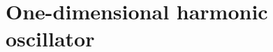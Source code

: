 \chapter{One-dimensional harmonic oscillator}
\startcontents[chapters]
{\vspace{2em}\color{black}\titlerule[2pt]}
\vspace*{\fill}

\newpage
{}






\newpage
%